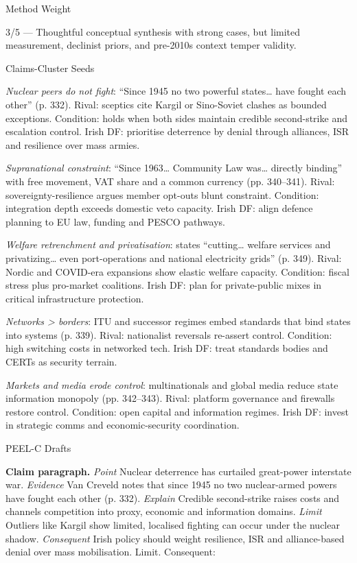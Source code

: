 Method Weight

3/5 — Thoughtful conceptual synthesis with strong cases, but limited measurement, declinist priors, and pre-2010s context temper validity.

Claims-Cluster Seeds

\textit{Nuclear peers do not fight}: “Since 1945 no two powerful states… have fought each other” (p. 332). Rival: sceptics cite Kargil or Sino-Soviet clashes as bounded exceptions. Condition: holds when both sides maintain credible second-strike and escalation control. Irish DF: prioritise deterrence by denial through alliances, ISR and resilience over mass armies.

\textit{Supranational constraint}: “Since 1963… Community Law was… directly binding” with free movement, VAT share and a common currency (pp. 340–341). Rival: sovereignty-resilience argues member opt-outs blunt constraint. Condition: integration depth exceeds domestic veto capacity. Irish DF: align defence planning to EU law, funding and PESCO pathways.

\textit{Welfare retrenchment and privatisation}: states “cutting… welfare services and privatizing… even port-operations and national electricity grids” (p. 349). Rival: Nordic and COVID-era expansions show elastic welfare capacity. Condition: fiscal stress plus pro-market coalitions. Irish DF: plan for private-public mixes in critical infrastructure protection.

\textit{Networks > borders}: ITU and successor regimes embed standards that bind states into systems (p. 339). Rival: nationalist reversals re-assert control. Condition: high switching costs in networked tech. Irish DF: treat standards bodies and CERTs as security terrain.

\textit{Markets and media erode control}: multinationals and global media reduce state information monopoly (pp. 342–343). Rival: platform governance and firewalls restore control. Condition: open capital and information regimes. Irish DF: invest in strategic comms and economic-security coordination.

PEEL-C Drafts

\textbf{Claim paragraph.} \textit{Point} Nuclear deterrence has curtailed great-power interstate war. \textit{Evidence} Van Creveld notes that since 1945 no two nuclear-armed powers have fought each other (p. 332). \textit{Explain} Credible second-strike raises costs and channels competition into proxy, economic and information domains. \textit{Limit} Outliers like Kargil show limited, localised fighting can occur under the nuclear shadow. \textit{Consequent} Irish policy should weight resilience, ISR and alliance-based denial over mass mobilisation. Limit. Consequent:

